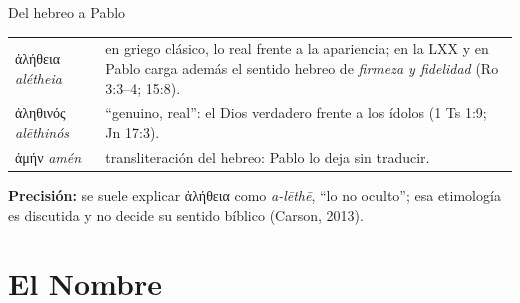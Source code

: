 \documentclass[hyperref={bookmarks=false},aspectratio=169]{beamer}
\newcommand{\heb}[1]{\mbox{\foreignlanguage{hebrew}{#1}}}
\newcommand{\grc}[1]{\foreignlanguage{ancientgreek}{#1}}
\newcommand{\precision}[1]{{\footnotesize\color{gris}\textbf{Precisión:} #1}}
\begin{document}
\begin{frame}{Del hebreo a Pablo}
\centering
{}\par\medskip
\scriptsize\renewcommand{\arraystretch}{1.15}
\begin{tabular}{@{}>{\RaggedRight\arraybackslash}p{2.6cm}>{\RaggedRight\arraybackslash}p{9.2cm}@{}}
\toprule
\grc{ἀλήθεια} \emph{alétheia} & en griego clásico, lo real frente a la apariencia; en la LXX y en Pablo carga además el sentido hebreo de \emph{firmeza y fidelidad} (Ro 3:3--4; 15:8). \\
\grc{ἀληθινός} \emph{alēthinós} & ``genuino, real'': el Dios verdadero frente a los ídolos (1 Ts 1:9; Jn 17:3). \\
\grc{ἀμήν} \emph{amén} & transliteración del hebreo: Pablo lo deja sin traducir. \\
\bottomrule
\end{tabular}\par\smallskip
\precision{se suele explicar \grc{ἀλήθεια} como \emph{a-lēthē}, ``lo no oculto''; esa etimología es discutida y no decide su sentido bíblico (Carson, 2013).}
\end{frame}

\section{El Nombre}
\end{document}
